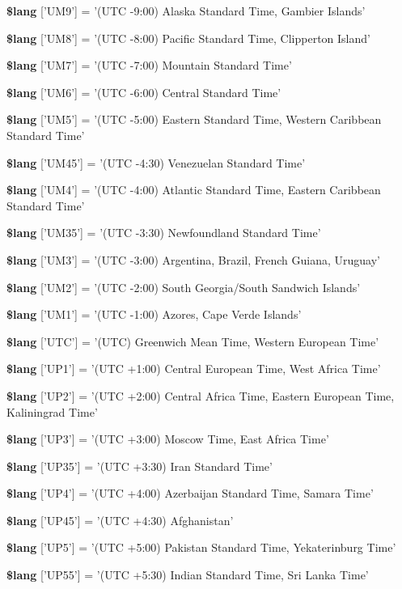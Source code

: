 \begin{DoxyCompactItemize}
\item 
{\bf \$lang} ['U\-M9'] = '(U\-T\-C -\/9\-:00) Alaska Standard Time, Gambier Islands'
\item 
{\bf \$lang} ['U\-M8'] = '(U\-T\-C -\/8\-:00) Pacific Standard Time, Clipperton Island'
\item 
{\bf \$lang} ['U\-M7'] = '(U\-T\-C -\/7\-:00) Mountain Standard Time'
\item 
{\bf \$lang} ['U\-M6'] = '(U\-T\-C -\/6\-:00) Central Standard Time'
\item 
{\bf \$lang} ['U\-M5'] = '(U\-T\-C -\/5\-:00) Eastern Standard Time, Western Caribbean Standard Time'
\item 
{\bf \$lang} ['U\-M45'] = '(U\-T\-C -\/4\-:30) Venezuelan Standard Time'
\item 
{\bf \$lang} ['U\-M4'] = '(U\-T\-C -\/4\-:00) Atlantic Standard Time, Eastern Caribbean Standard Time'
\item 
{\bf \$lang} ['U\-M35'] = '(U\-T\-C -\/3\-:30) Newfoundland Standard Time'
\item 
{\bf \$lang} ['U\-M3'] = '(U\-T\-C -\/3\-:00) Argentina, Brazil, French Guiana, Uruguay'
\item 
{\bf \$lang} ['U\-M2'] = '(U\-T\-C -\/2\-:00) South Georgia/South Sandwich Islands'
\item 
{\bf \$lang} ['U\-M1'] = '(U\-T\-C -\/1\-:00) Azores, Cape Verde Islands'
\item 
{\bf \$lang} ['U\-T\-C'] = '(U\-T\-C) Greenwich Mean Time, Western European Time'
\item 
{\bf \$lang} ['U\-P1'] = '(U\-T\-C +1\-:00) Central European Time, West Africa Time'
\item 
{\bf \$lang} ['U\-P2'] = '(U\-T\-C +2\-:00) Central Africa Time, Eastern European Time, Kaliningrad Time'
\item 
{\bf \$lang} ['U\-P3'] = '(U\-T\-C +3\-:00) Moscow Time, East Africa Time'
\item 
{\bf \$lang} ['U\-P35'] = '(U\-T\-C +3\-:30) Iran Standard Time'
\item 
{\bf \$lang} ['U\-P4'] = '(U\-T\-C +4\-:00) Azerbaijan Standard Time, Samara Time'
\item 
{\bf \$lang} ['U\-P45'] = '(U\-T\-C +4\-:30) Afghanistan'
\item 
{\bf \$lang} ['U\-P5'] = '(U\-T\-C +5\-:00) Pakistan Standard Time, Yekaterinburg Time'
\item 
{\bf \$lang} ['U\-P55'] = '(U\-T\-C +5\-:30) Indian Standard Time, Sri Lanka Time'
\item 

\end{DoxyCompactItemize}
